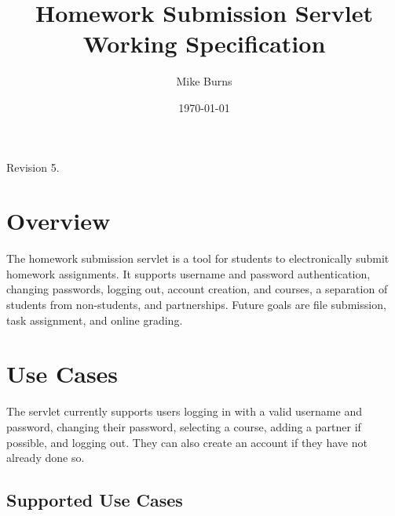 \documentclass[a4paper]{article}
\begin{document}
\title{Homework Submission Servlet Working Specification}
\author{Mike Burns}
\date{\today}

\maketitle

Revision 5.

\section{Overview}\label{sec:overview}

The homework submission servlet is a tool for students to electronically submit
homework assignments. It supports username and password authentication,
changing passwords, logging out, account creation, and courses, a separation of
students from non-students, and partnerships. Future goals are file submission,
task assignment, and online grading.

\section{Use Cases}\label{sec:usecases}

The servlet currently supports users logging in with a valid username and
password, changing their password, selecting a course, adding a partner if
possible, and logging out. They can also create an account if they have not
already done so.

\subsection{Supported Use Cases}\label{subsec:detailed-usecases}
\end{document}
